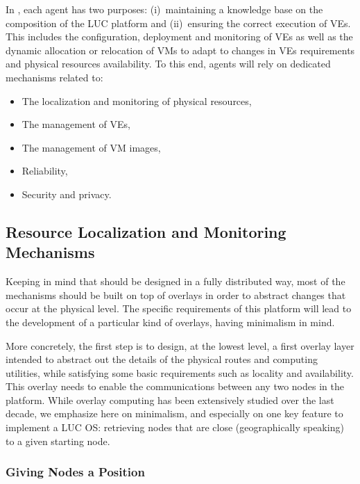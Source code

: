 In \discovery, each agent has two purposes: (i)~maintaining a knowledge base on the
composition of the LUC platform and (ii)~ensuring the correct execution of VEs. 
This includes the configuration, deployment and monitoring of
VEs as well as the dynamic allocation or relocation of VMs to adapt to changes
in VEs requirements and physical resources availability. To this end, agents
will rely on dedicated mechanisms related to: 

\begin{itemize}
\item The localization and monitoring of physical resources, 
\item The management of VEs, 
\item The management of VM images, 
\item Reliability,
\item Security and privacy.
\end{itemize}

\subsection{Resource Localization and Monitoring Mechanisms\label{ssec:p2p}}

Keeping in mind that \discovery should be designed in a fully distributed way,
most of the mechanisms should be built on top of overlays in order to abstract changes
that occur at the physical level. The specific requirements of this platform
will lead to the development of a particular kind of overlays, having minimalism in mind.

More concretely, the first step is to design, at the lowest level, a first
overlay layer intended to abstract out the details of the physical routes and
computing utilities, while satisfying some basic requirements such as
locality and availability. This overlay needs to enable the communications
between any two nodes in the platform. While overlay computing has been
extensively studied over the last decade, we emphasize here on minimalism, and
especially on one key feature to implement a LUC OS: 
retrieving nodes that are close (geographically speaking) to a given starting node.

\subsubsection*{Giving Nodes a Position}

